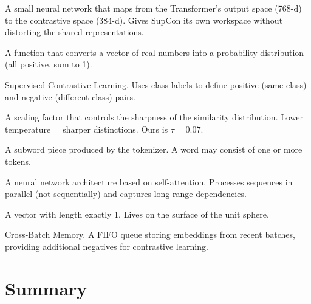 \documentclass[11pt,a4paper]{article}
\theoremstyle{definition}
\begin{document}
\begin{description}[style=nextline, leftmargin=3.5cm, font=\bfseries]
  \item[Projection head]
    A small neural network that maps from the Transformer's output
    space (768-d) to the contrastive space (384-d). Gives SupCon its
    own workspace without distorting the shared representations.

  \item[Softmax]
    A function that converts a vector of real numbers into a
    probability distribution (all positive, sum to 1).

  \item[SupCon]
    Supervised Contrastive Learning. Uses class labels to define
    positive (same class) and negative (different class) pairs.

  \item[Temperature]
    A scaling factor that controls the sharpness of the similarity
    distribution. Lower temperature = sharper distinctions. Ours is
    $\tau = 0.07$.

  \item[Token]
    A subword piece produced by the tokenizer. A word may consist of
    one or more tokens.

  \item[Transformer]
    A neural network architecture based on self-attention. Processes
    sequences in parallel (not sequentially) and captures long-range
    dependencies.

  \item[Unit vector]
    A vector with length exactly 1. Lives on the surface of the unit
    sphere.

  \item[XBM]
    Cross-Batch Memory. A FIFO queue storing embeddings from recent
    batches, providing additional negatives for contrastive learning.

\end{description}

\newpage
\part*{Summary}
\end{document}
